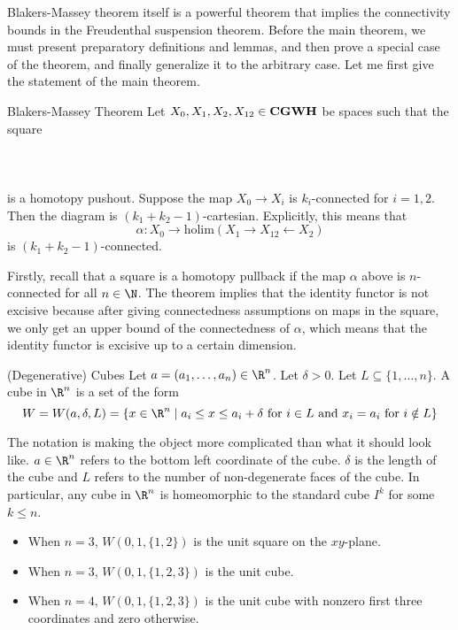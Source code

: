 \documentclass[a4paper]{article}
\begin{document}
Blakers-Massey theorem itself is a powerful theorem that implies the connectivity bounds in the Freudenthal suspension theorem. Before the main theorem, we must present preparatory definitions and lemmas, and then prove a special case of the theorem, and finally generalize it to the arbitrary case. Let me first give the statement of the main theorem. 

\begin{thm}{Blakers-Massey Theorem}{} Let $X_0,X_1,X_2,X_{12}\in\bold{CGWH}$ be spaces such that the square \\~\\
\\~\\
is a homotopy pushout. Suppose the map $X_0\to X_i$ is $k_i$-connected for $i=1,2$. Then the diagram is $(k_1+k_2-1)$-cartesian. Explicitly, this means that $$\alpha:X_0\to\text{holim}(X_1\rightarrow X_{12}\leftarrow X_2)$$ is $(k_1+k_2-1)$-connected. 
\end{thm}

Firstly, recall that a square is a homotopy pullback if the map $\alpha$ above is $n$-connected for all $n\in\N$. The theorem implies that the identity functor is not excisive because after giving connectedness assumptions on maps in the square, we only get an upper bound of the connectedness of $\alpha$, which means that the identity functor is excisive up to a certain dimension. 

\begin{defn}{(Degenerative) Cubes}{} Let $a=(a_1,\dots,a_n)\in\R^n$. Let $\delta>0$. Let $L\subseteq\{1,\dots,n\}$. A cube in $\R^n$ is a set of the form $$W=W(a,\delta,L)=\{x\in\R^n\;|\;a_i\leq x\leq a_i+\delta\text{ for }i\in L\text{ and }x_i=a_i\text{ for }i\notin L\}$$
\end{defn}

The notation is making the object more complicated than what it should look like. $a\in\R^n$ refers to the bottom left coordinate of the cube. $\delta$ is the length of the cube and $L$ refers to the number of non-degenerate faces of the cube. In particular, any cube in $\R^n$ is homeomorphic to the standard cube $I^k$ for some $k\leq n$. 
\begin{itemize}
\item When $n=3$, $W(0,1,\{1,2\})$ is the unit square on the $xy$-plane. 
\item When $n=3$, $W(0,1,\{1,2,3\})$ is the unit cube. 
\item When $n=4$, $W(0,1,\{1,2,3\})$ is the unit cube with nonzero first three coordinates and zero otherwise. 
\end{itemize}
\end{document}
